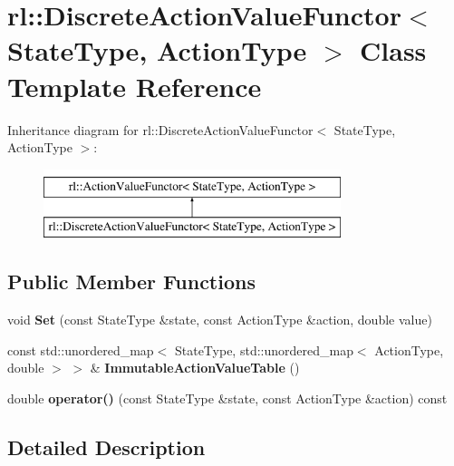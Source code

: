 \hypertarget{classrl_1_1_discrete_action_value_functor}{}\section{rl\+:\+:Discrete\+Action\+Value\+Functor$<$ State\+Type, Action\+Type $>$ Class Template Reference}
\label{classrl_1_1_discrete_action_value_functor}
Inheritance diagram for rl\+:\+:Discrete\+Action\+Value\+Functor$<$ State\+Type, Action\+Type $>$\+:\begin{figure}[H]
\begin{center}
\leavevmode
\includegraphics[height=2.000000cm]{classrl_1_1_discrete_action_value_functor}
\end{center}
\end{figure}
\subsection*{Public Member Functions}
\begin{DoxyCompactItemize}
\item 
\hypertarget{classrl_1_1_discrete_action_value_functor_a05b2e109cfcde8169b5cec710412cb54}{}\label{classrl_1_1_discrete_action_value_functor_a05b2e109cfcde8169b5cec710412cb54} 
void {\bfseries Set} (const State\+Type \&state, const Action\+Type \&action, double value)
\item 
\hypertarget{classrl_1_1_discrete_action_value_functor_ac6ac720590f2b5074ea14185e45828f6}{}\label{classrl_1_1_discrete_action_value_functor_ac6ac720590f2b5074ea14185e45828f6} 
const std\+::unordered\+\_\+map$<$ State\+Type, std\+::unordered\+\_\+map$<$ Action\+Type, double $>$ $>$ \& {\bfseries Immutable\+Action\+Value\+Table} ()
\item 
\hypertarget{classrl_1_1_discrete_action_value_functor_a74c6f0ed5af23c049dafac2b7b02f8f6}{}\label{classrl_1_1_discrete_action_value_functor_a74c6f0ed5af23c049dafac2b7b02f8f6} 
double {\bfseries operator()} (const State\+Type \&state, const Action\+Type \&action) const
\end{DoxyCompactItemize}


\subsection{Detailed Description}
